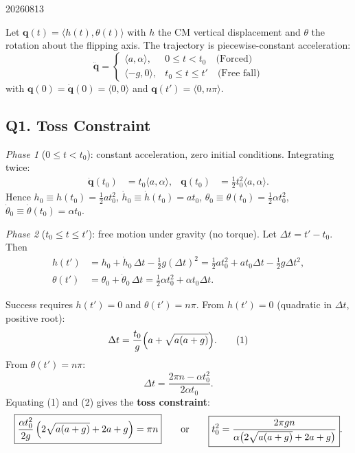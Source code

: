 \begin{solution}{20260813}

Let $\mathbf q(t) = \langle h(t), \theta(t)\rangle$ with $h$ the CM vertical displacement and $\theta$ the rotation about the flipping axis.  The trajectory is piecewise-constant acceleration:
\[
\ddot{\mathbf q} =
\begin{cases}
\langle a, \alpha \rangle, & 0 \le t < t_0 \quad\text{(Forced)}\\[2pt]
\langle -g, 0 \rangle,      & t_0 \le t \le t' \quad\text{(Free fall)}
\end{cases}
\]
with $\mathbf q(0) = \dot{\mathbf q}(0) = \langle 0,0\rangle$ and $\mathbf q(t') = \langle 0, n\pi\rangle$.

\subsection*{Q1. Toss Constraint}

\textit{Phase 1} ($0 \le t < t_0$): constant acceleration, zero initial conditions.  Integrating twice:
\begin{align*}
\dot{\mathbf q}(t_0) &= t_0\langle a,\alpha\rangle,
& \mathbf q(t_0) &= \tfrac12 t_0^2\langle a,\alpha\rangle.
\end{align*}
Hence $h_0 \equiv h(t_0) = \tfrac12 a t_0^2$, $\dot h_0 \equiv \dot h(t_0) = a t_0$, $\theta_0 \equiv \theta(t_0) = \tfrac12 \alpha t_0^2$, $\dot\theta_0 \equiv \dot\theta(t_0) = \alpha t_0$.

\textit{Phase 2} ($t_0 \le t \le t'$): free motion under gravity (no torque).  Let $\Delta t = t' - t_0$.  Then
\begin{align*}
h(t') &= h_0 + \dot h_0\,\Delta t - \tfrac12 g(\Delta t)^2
      = \tfrac12 a t_0^2 + a t_0\Delta t - \tfrac12 g\Delta t^2, \\[4pt]
\theta(t') &= \theta_0 + \dot\theta_0\,\Delta t
           = \tfrac12 \alpha t_0^2 + \alpha t_0\Delta t.
\end{align*}

Success requires $h(t') = 0$ and $\theta(t') = n\pi$.  From $h(t') = 0$ (quadratic in $\Delta t$, positive root):
\[
\Delta t = \frac{t_0}{g}\Bigl(a + \sqrt{a(a+g)}\Bigr). \tag{1}
\]
From $\theta(t') = n\pi$:
\[
\Delta t = \frac{2\pi n - \alpha t_0^2}{2\alpha t_0}. \tag{2}
\]
Equating (1) and (2) gives the \textbf{toss constraint}:
\[
\boxed{\frac{\alpha t_0^2}{2g}\,\Bigl(2\sqrt{a(a+g)} + 2a + g\Bigr) = \pi n}
\qquad\text{or}\qquad
\boxed{t_0^2 = \frac{2\pi g n}{\alpha\bigl(2\sqrt{a(a+g)} + 2a + g\bigr)}}.
\]


\end{solution}
